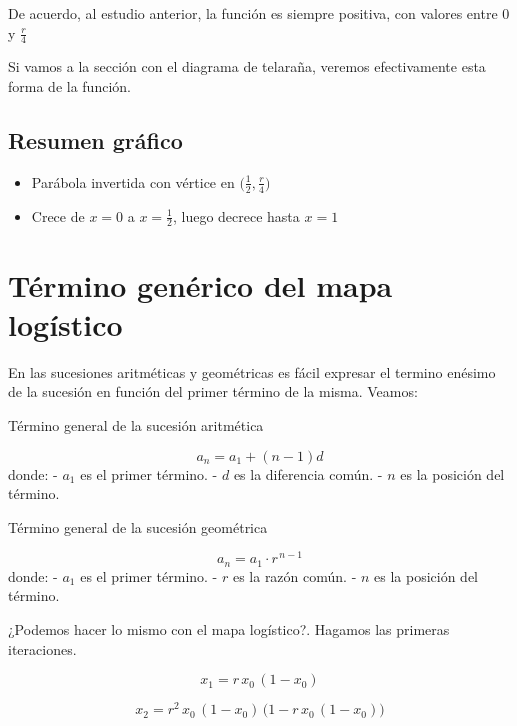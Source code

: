 \documentclass[
  10pt,
  a4paper,
  DIV=11,
  numbers=noendperiod,
  open=any]{scrreprt}
\providecommand{\tightlist}{%
  \setlength{\itemsep}{0pt}\setlength{\parskip}{0pt}}
\numberwithin{equation}{chapter}
\numberwithin{equation}{chapter}
\renewcommand{\[}{\begin{equation}}
\renewcommand{\]}{\end{equation}}
\begin{document}
De acuerdo, al estudio anterior, la función es siempre positiva, con
valores entre \(0\) y \(\tfrac{r}{4}\)

Si vamos a la sección con el diagrama de telaraña, veremos efectivamente
esta forma de la función.

\section{Resumen gráfico}\label{resumen-gruxe1fico}

\begin{itemize}
\tightlist
\item
  Parábola invertida con vértice en
  \(\bigl(\tfrac12,\tfrac{r}{4}\bigr)\)\\
\item
  Crece de \(x=0\) a \(x=\tfrac12\), luego decrece hasta \(x=1\)
\end{itemize}


\chapter{Término genérico del mapa
logístico}\label{tuxe9rmino-genuxe9rico-del-mapa-loguxedstico}

En las sucesiones aritméticas y geométricas es fácil expresar el termino
enésimo de la sucesión en función del primer término de la misma.
Veamos:

Término general de la sucesión aritmética

\[a_n = a_1 + (n-1)d\] donde: - \(a_1\) es el primer término. - \(d\) es
la diferencia común. - \(n\) es la posición del término.

Término general de la sucesión geométrica

\[a_n = a_1 \cdot r^{\,n-1}\] donde: - \(a_1\) es el primer término. -
\(r\) es la razón común. - \(n\) es la posición del término.

¿Podemos hacer lo mismo con el mapa logístico?. Hagamos las primeras
iteraciones.

\begin{equation}

x_1 = r\,x_0\,(1 - x_0)

\end{equation}

\begin{equation}

x_2 = r^2\,x_0\,(1 - x_0)\,\bigl(1 - r\,x_0\,(1 - x_0)\bigr)

\end{equation}
\end{document}
